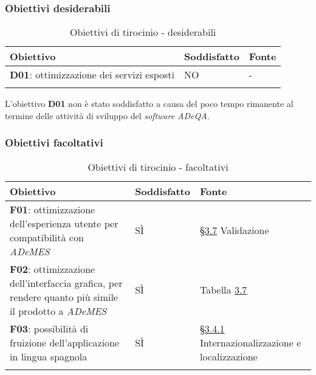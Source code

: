 \subsubsection*{Obiettivi desiderabili}
\begin{longtable}{>{\centering\arraybackslash}m{}>{\centering\arraybackslash}m{}>{\centering\arraybackslash}m{}}
    \hline
    \rowcolor{black}
    \color{white}\textbf{Obiettivo} & \color{white}\textbf{Soddisfatto} & \color{white}\textbf{Fonte} \\
    \hline
    \endhead %
    \textbf{D01}: ottimizzazione dei servizi esposti & NO & - \\
    \hline
    \caption{Obiettivi di tirocinio - desiderabili}
\end{longtable}
L'obiettivo \textbf{D01} non è stato soddisfatto a causa del poco tempo rimanente al termine delle attività di sviluppo del \textit{software ADeQA}.

\subsubsection*{Obiettivi facoltativi}
\begin{longtable}{>{\centering\arraybackslash}m{}>{\centering\arraybackslash}m{}>{\centering\arraybackslash}m{}}
    \hline
    \rowcolor{black}
    \color{white}\textbf{Obiettivo} & \color{white}\textbf{Soddisfatto} & \color{white}\textbf{Fonte} \\
    \hline
    \endhead %
    \textbf{F01}: ottimizzazione dell'esperienza utente per compatibilità con \textit{ADeMES} & SÌ & \hyperref[sec:validazione]{§3.7} Validazione \\
    \hline
    \textbf{F02}: ottimizzazione dell'interfaccia grafica, per rendere quanto più simile il prodotto a \textit{ADeMES} & SÌ & Tabella \hyperref[tab:colors]{3.7} \\
    \hline
    \textbf{F03}: possibilità di fruizione dell'applicazione in lingua spagnola & SÌ & \hyperref[subsec:internazionalizzazione]{§3.4.1} Internazionalizzazione e localizzazione \\
    \hline
    \caption{Obiettivi di tirocinio - facoltativi}
\end{longtable}


